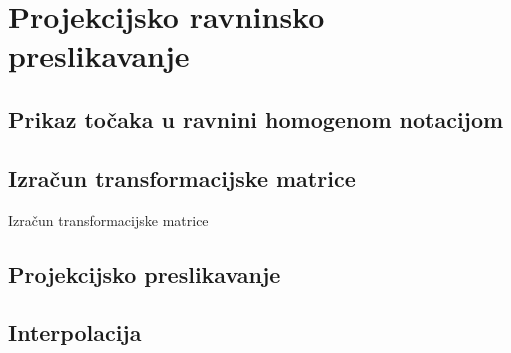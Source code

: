 \chapter{Projekcijsko ravninsko preslikavanje}

\section{Prikaz točaka u ravnini homogenom notacijom}

\section{Izračun transformacijske matrice}
Izračun transformacijske matrice

\section{Projekcijsko preslikavanje}

\section{Interpolacija}